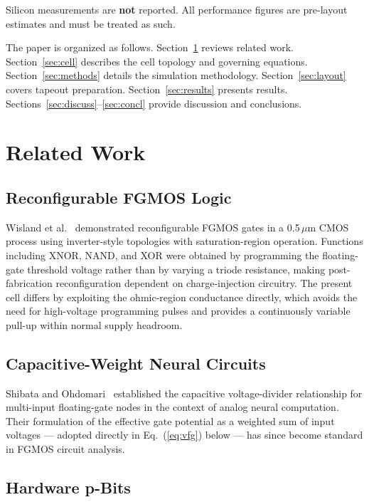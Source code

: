 \documentclass[a4paper,fleqn]{cas-sc}
\begin{document}
Silicon measurements are \textbf{not} reported. All performance figures are
pre-layout estimates and must be treated as such.

The paper is organized as follows. Section~\ref{sec:related} reviews related work.
Section~\ref{sec:cell} describes the cell topology and governing equations.
Section~\ref{sec:methods} details the simulation methodology.
Section~\ref{sec:layout} covers tapeout preparation.
Section~\ref{sec:results} presents results.
Sections~\ref{sec:discuss}--\ref{sec:concl} provide discussion and conclusions.

\section{Related Work}
\label{sec:related}

\subsection{Reconfigurable FGMOS Logic}

Wisland et al.~\cite{Wisland2003} demonstrated reconfigurable FGMOS gates in a
0.5\,$\mu$m CMOS process using inverter-style topologies with saturation-region
operation. Functions including XNOR, NAND, and XOR were obtained by programming the
floating-gate threshold voltage rather than by varying a triode resistance, making
post-fabrication reconfiguration dependent on charge-injection circuitry. The present
cell differs by exploiting the ohmic-region conductance directly, which avoids the need
for high-voltage programming pulses and provides a continuously variable pull-up within
normal supply headroom.

\subsection{Capacitive-Weight Neural Circuits}

Shibata and Ohdomari~\cite{Shibata2003} established the capacitive voltage-divider
relationship for multi-input floating-gate nodes in the context of analog neural
computation. Their formulation of the effective gate potential as a weighted sum of
input voltages --- adopted directly in Eq.~(\ref{eq:vfg}) below --- has since become
standard in FGMOS circuit analysis.

\subsection{Hardware p-Bits}
\end{document}
